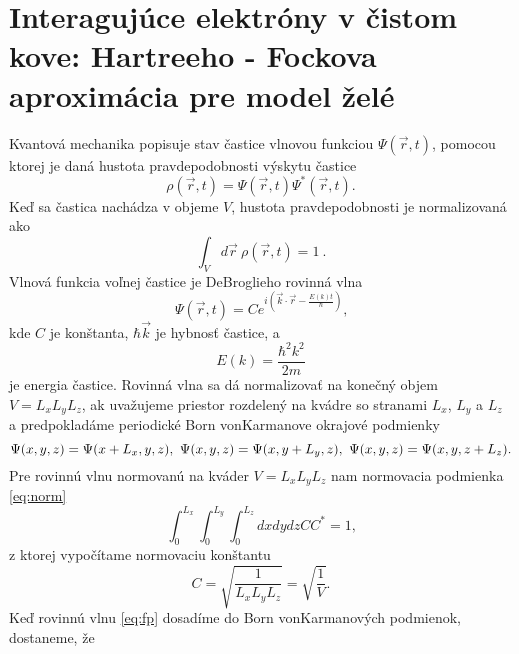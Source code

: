 \section{Interagujúce elektróny v čistom kove: Hartreeho - Fockova aproximácia pre model želé}
\label{sec:free_electrons}

Kvantová mechanika popisuje stav častice vlnovou funkciou $\Psi(\vec r,t)$, pomocou ktorej
je daná hustota pravdepodobnosti výskytu častice
\begin{equation}
\label{eq:fp2}
 \rho(\vec r, t)=\Psi(\vec r, t)\Psi^\ast(\vec r, t)\text{.}
\end{equation}
Keď sa častica nachádza v objeme $V$, hustota pravdepodobnosti je normalizovaná ako
\begin{equation}
\label{eq:norm}
 \int_{V} d \vec r  \  \rho(\vec r,t) = 1 \ .
\end{equation}
Vlnová funkcia voľnej častice je DeBroglieho rovinná vlna
\begin{equation}
\label{eq:fp}
 \Psi(\vec r,t)=Ce^{i(\vec k\cdot\vec r-\frac{E(k)t}{\hbar})} \text{,}
\end{equation}
kde $C$ je konštanta, $\hbar \vec k$ je hybnosť častice, a
\begin{equation}
 \label{eq:fp_erg}
 E(k)=\frac{\hbar^2 k^2}{2 m} \text{}
\end{equation}
je energia častice. Rovinná vlna sa dá normalizovať na konečný objem $V = L_xL_yL_z$,
ak uvažujeme priestor rozdelený na kvádre so stranami $L_x$, $L_y$ a $L_z$ a predpokladáme
periodické Born vonKarmanove okrajové podmienky
\begin{equation}
 \Psi(x,y,z)=\Psi(x+L_x,y,z)\\, \\\ \Psi(x,y,z)=\Psi(x,y+L_y,z)\\, \\\ \Psi(x,y,z)=\Psi(x,y,z+L_z) \text{.}
\end{equation}
Pre rovinnú vlnu normovanú na kváder $V = L_xL_yL_z$ nam normovacia podmienka \eqref{eq:norm}
\begin{equation}
\label{eq:norm_bvk}
 \int_{0}^{L_x}  \int_{0}^{L_y}  \int_{0}^{L_z} dx dy dz  CC^\ast = 1\text{,}
\end{equation}
z ktorej vypočítame normovaciu konštantu
\begin{equation}
 \label{eq:A}
 C=\sqrt{\frac{1}{L_xL_yL_z}} = \sqrt{\frac{1}{V}} \text{.}
\end{equation}
Keď rovinnú vlnu \eqref{eq:fp} dosadíme do Born vonKarmanových podmienok, dostaneme, že
